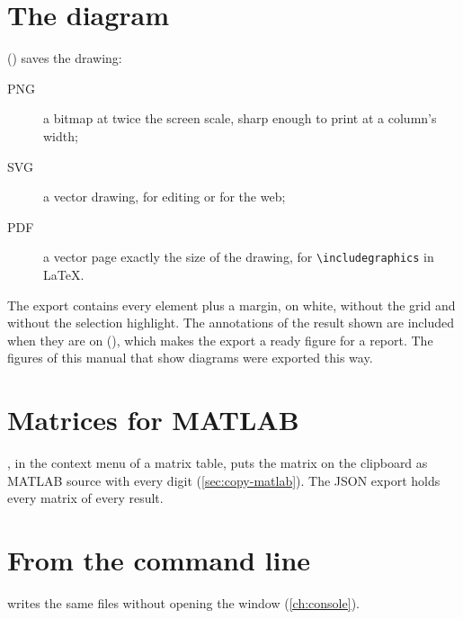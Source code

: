 \section{The diagram}\label{sec:export-diagram}

 () saves the drawing:

\begin{description}
  \item[PNG] a bitmap at twice the screen scale, sharp enough to print at a column's
    width;
  \item[SVG] a vector drawing, for editing or for the web;
  \item[PDF] a vector page exactly the size of the drawing, for \verb|\includegraphics| in
    LaTeX.
\end{description}

The export contains every element plus a margin, on white, without the grid and without
the selection highlight. The annotations of the result shown are included when they are
on (), which makes the export a ready figure for a report. The figures of
this manual that show diagrams were exported this way.

\section{Matrices for MATLAB}

, in the context menu of a matrix table, puts the matrix on the
clipboard as MATLAB source with every digit (\cref{sec:copy-matlab}). The JSON export
holds every matrix of every result.

\section{From the command line}

 writes the same files without opening the
window (\cref{ch:console}).

